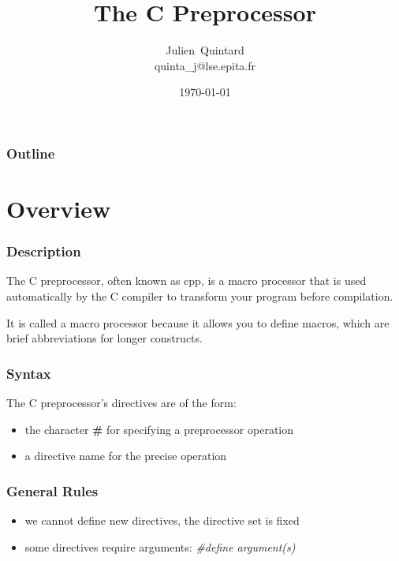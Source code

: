 \documentclass[9pt]{beamer}
\title{The C Preprocessor}
\author
{
  Julien~Quintard\inst{1} \\
  {\tiny quinta\_j@lse.epita.fr}
}
\institute
{
  \inst{1} EPITA Computer System Laboratory
}
\date{\today}
\newcommand{\nl}[0]{\vspace{0.4cm}}
\begin{document}
%
%

\begin{frame}
  \titlepage
\end{frame}

%
%

\begin{frame}
  \frametitle{Outline}
  \tableofcontents
\end{frame}

%
%

\section{Overview}


\begin{frame}
  \frametitle{Description}

  The C preprocessor, often known as cpp, is a macro processor that
  is used automatically by the C compiler to transform your program
  before compilation.

  \nl

  It is called a macro processor because it allows you to define macros,
  which are brief abbreviations for longer constructs.

\end{frame}


\begin{frame}
  \frametitle{Syntax}

  The C preprocessor's directives are of the form:

  \begin{itemize}
    \item
      the character \textbf{\#} for specifying a preprocessor operation
    \item
      a directive name for the precise operation
  \end{itemize}

\end{frame}


\begin{frame}
  \frametitle{General Rules}

  \begin{itemize}
    \item
      we \alert{cannot} define new directives, the directive set is fixed
    \item
      some directives require arguments: \textit{\#define argument(s)}
  \end{itemize}

\end{frame}
\end{document}
